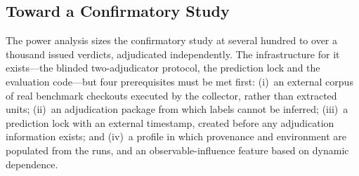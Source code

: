 \subsection{Toward a Confirmatory Study}
The power analysis sizes the confirmatory study at several hundred to over a thousand issued \NDO{} verdicts, adjudicated independently. The infrastructure for it exists---the blinded two-adjudicator protocol, the prediction lock and the evaluation code---but four prerequisites must be met first: (i)~an external corpus of real benchmark checkouts executed by the collector, rather than extracted units; (ii)~an adjudication package from which labels cannot be inferred; (iii)~a prediction lock with an external timestamp, created before any adjudication information exists; and (iv)~a profile in which provenance and environment are populated from the runs, and an observable-influence feature based on dynamic dependence.
